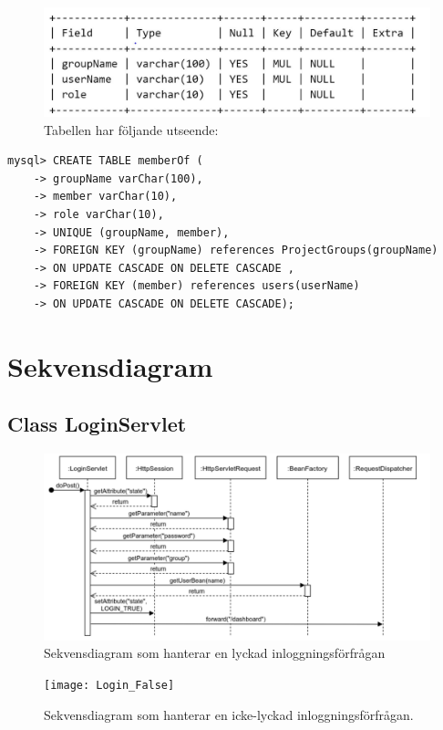 \documentclass[paper=a4, fontsize=11pt,twoside]{article}
\begin{document}
\begin{figure}[H]
\centering
\caption{Tabellen har följande utseende:}
\includegraphics{memberOfTable}
\end{figure}

\begin{lstlisting}[frame=single, caption={Tabellen kan konstrueras med följande SQL-satser:}]
mysql> CREATE TABLE memberOf (
    -> groupName varChar(100),
    -> member varChar(10),
    -> role varChar(10),
    -> UNIQUE (groupName, member),
    -> FOREIGN KEY (groupName) references ProjectGroups(groupName) 
    -> ON UPDATE CASCADE ON DELETE CASCADE ,
    -> FOREIGN KEY (member) references users(userName) 
    -> ON UPDATE CASCADE ON DELETE CASCADE);
\end{lstlisting}


\newpage
\section{Sekvensdiagram}
\subsection{Class LoginServlet}
\begin{figure}[H]
\centering
\includegraphics[width=140mm]{LoginServlet}
\caption{Sekvensdiagram som hanterar en lyckad inloggningsförfrågan}
\end{figure}

\begin{figure}[H]
\centering
\texttt{[image: Login\_False]}
\caption{Sekvensdiagram som hanterar en icke-lyckad inloggningsförfrågan.}
\end{figure}
\end{document}
